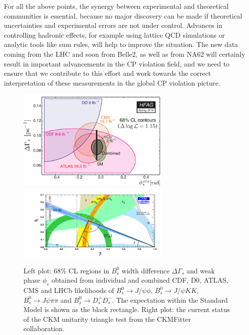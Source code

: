 For all the above points, the synergy between experimental and theoretical communities is essential, because no major discovery can be made if theoretical uncertainties and experimental errors are not under control. Advances in controlling
hadronic effects, for example using lattice QCD simulations or analytic tools like sum rules, will help to improve the situation.
 The new data coming from the LHC and soon from Belle2, as well as from NA62 will certainly result in important advancements in the CP violation field, and we need to ensure that we contribute to this effort and work towards the correct interpretation of these measurements in the global CP violation picture. 


\begin{figure}[!htb]
\begin{center}
\includegraphics[width=7.5cm]{hfag_Spring2016_DGsphis_zoom.pdf}
\includegraphics[width=7.5cm]{rhoeta_small_global.pdf}
\end{center}
\caption{Left plot: 68\% CL regions in $B^{0}_{s}$ width difference $\Delta\Gamma_{s}$
and weak phase $\phi_{s}$ obtained from individual and combined CDF, D0,
ATLAS, CMS and LHCb likelihoods of $B^{0}_{s}\to J/\psi\phi$, $B^{0}_{s}\to
J/\psi KK$, $B^{0}_{s}\to J\psi\pi\pi$ and $B^{0}_{s}\to D_{s}^{+}D_{s}^{-}%
$. The expectation within the Standard Model is shown as the black rectangle. Right plot: the current status of the CKM unitarity triangle test from the CKMFitter collaboration. }%
\label{figphis}%
\end{figure}



